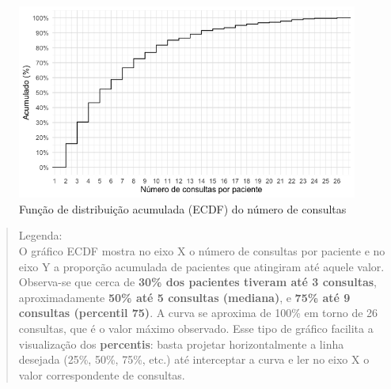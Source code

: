 \documentclass[
]{article}
\begin{document}
\begin{figure}[H]

{\centering \includegraphics[width=1\textwidth,height=\textheight]{outputs/figs/n-consultas-ecdf-1.png}

}

\caption{Função de distribuição acumulada (ECDF) do número de consultas}

\end{figure}%

\begin{quote}
Legenda:\\
O gráfico ECDF mostra no eixo X o número de consultas por paciente e no
eixo Y a proporção acumulada de pacientes que atingiram até aquele
valor. Observa-se que cerca de \textbf{30\% dos pacientes tiveram até 3
consultas}, aproximadamente \textbf{50\% até 5 consultas (mediana)}, e
\textbf{75\% até 9 consultas (percentil 75)}. A curva se aproxima de
100\% em torno de 26 consultas, que é o valor máximo observado. Esse
tipo de gráfico facilita a visualização dos \textbf{percentis}: basta
projetar horizontalmente a linha desejada (25\%, 50\%, 75\%, etc.) até
interceptar a curva e ler no eixo X o valor correspondente de consultas.
\end{quote}
\end{document}
